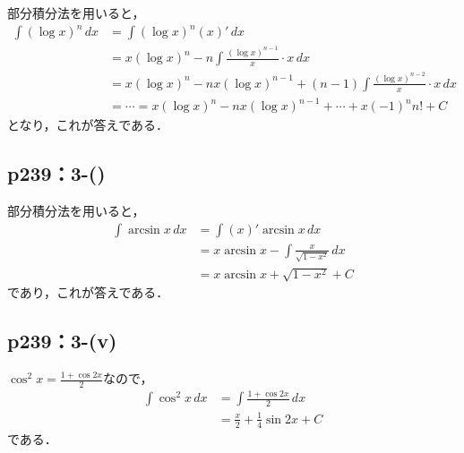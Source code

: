 \documentclass[a4paper,10pt,fleqn]{ltjsarticle}
\begin{document}
\begin{tleftbar}
    部分積分法を用いると，
    \begin{align*}
        \int (\log x)^n \, dx & = \int (\log x)^n  (x)' \, dx                                                           \\
                              & = x (\log x)^n - n \int  \frac{(\log x)^{n-1}}{x} \cdot  x \, dx                        \\
                              & =  x (\log x)^n - n x(\log x)^{n-1} + (n-1) \int \frac{(\log x)^{n-2}}{x} \cdot x \, dx \\
                              & = \cdots = x (\log x)^n - n x(\log x)^{n-1} + \cdots + x(-1)^n n!+C
    \end{align*}
    となり，これが答えである．
\end{tleftbar}

\subsection*{p239：3-()}
\begin{leftbar}
    部分積分法を用いると，
    \begin{align*}
        \int \arcsin x \, dx & = \int (x)' \arcsin x \, dx                        \\
                             & = x \arcsin x  - \int \frac{x}{\sqrt{1-x^2}} \, dx \\
                             & = x \arcsin x + \sqrt{1-x^2} + C
    \end{align*}
    であり，これが答えである．
\end{leftbar}

\subsection*{p239：3-(v)}

\begin{tleftbar}
    $\cos ^2 x = \frac{1+\cos 2x}{2}$なので，
    \begin{align*}
        \int \cos ^2 x \, dx & = \int \frac{1+\cos 2x}{2} \, dx      \\
                             & = \frac{x}{2}+\frac{1}{4} \sin 2x + C
    \end{align*}
    である．
\end{tleftbar}
\end{document}
